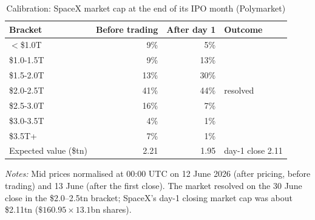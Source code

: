 \begin{table}[!htbp]\centering\footnotesize
\caption{Calibration: SpaceX market cap at the end of its IPO month (Polymarket)}\label{tab:pm4}

\begin{threeparttable}
\begin{tabular}{lrrl}
\toprule
Bracket & Before trading & After day 1 & Outcome \\
\midrule
$<$\$1.0T & 9\% & 5\% &  \\
\$1.0-1.5T & 9\% & 13\% &  \\
\$1.5-2.0T & 13\% & 30\% &  \\
\$2.0-2.5T & 41\% & 44\% & resolved \\
\$2.5-3.0T & 16\% & 7\% &  \\
\$3.0-3.5T & 4\% & 1\% &  \\
\$3.5T+ & 7\% & 1\% &  \\
\midrule
Expected value (\$tn) & 2.21 & 1.95 & day-1 close 2.11 \\
\bottomrule
\end{tabular}
\begin{tablenotes}[flushleft]\footnotesize
\item \textit{Notes:} Mid prices normalised at 00:00 UTC on 12 June 2026 (after pricing, before trading) and 13 June (after the first close). The market resolved on the 30 June close in the \$2.0--2.5tn bracket; SpaceX's day-1 closing market cap was about \$2.11tn ($\$160.95\times13.1$bn shares).
\end{tablenotes}
\end{threeparttable}

\end{table}
